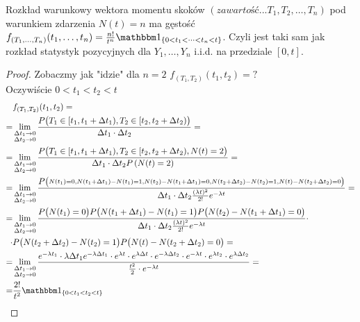 \begin{twr}
Rozkład warunkowy wektora momentu skoków $ \left(zawartość...T_1,T_2,\dots,T_n\right) $ pod warunkiem zdarzenia $ N(t)=n $ ma gęstość $ f_{(T_1,\dots,T_n)}(t_1,\dots,t_n)=\frac{n!}{t^n}\mathbbm1_{\{0<t_1<\dots<t_n<t\}} $. Czyli jest taki sam jak rozkład statystyk pozycyjnych dla $ Y_1,\dots,Y_n$ i.i.d. na przedziale $ [0,t] $.
\begin{proof}
Zobaczmy jak "idzie" dla $ n=2 $ $ f_{(T_1,T_2)}(t_1,t_2)=? $\\
Oczywiście $ 0<t_1<t_2<t $
\begin{align*}
&f_{(T_1,T_2)}(t_1,t_2)
=\\=&
\lim\limits_{\substack{\Delta t_1\to0\\\Delta t_2\to0}}
\frac{P\bigl(T_1\in[t_1,t_1+\Delta t_1),T_2\in[t_2,t_2+\Delta t_2)\bigr)}{\Delta t_1\cdot \Delta t_2}
=\\=&
\lim\limits_{\substack{\Delta t_1\to0\\\Delta t_2\to0}}
\frac{P\bigl(T_1\in[t_1,t_1+\Delta t_1),T_2\in[t_2,t_2+\Delta t_2),N(t)=2\bigr)}{\Delta t_1\cdot \Delta t_2P\left(N(t)=2\right)}
=\\=&
\lim\limits_{\substack{\Delta t_1\to0\\\Delta t_2\to0}}
\frac{P\bigl(
\substack{N(t_1)=0,N(t_1+\Delta t_1)-N(t_1)=1,N(t_2)-N(t_1+\Delta t_1)=0,N(t_2+\Delta t_2)-N(t_2)=1,N(t)-N(t_2+\Delta t_2)=0}
\bigr)}{\Delta t_1\cdot \Delta t_2\frac{(\lambda t)^2}{2!}e^{-\lambda t}}
=\\=&
\lim\limits_{\substack{\Delta t_1\to0\\\Delta t_2\to0}}
\frac{P\bigl(
N(t_1)=0\bigr)P\bigl(N(t_1+\Delta t_1)-N(t_1)=1\bigr)P\bigl(N(t_2)-N(t_1+\Delta t_1)=0\bigr)}{\Delta t_1\cdot \Delta t_2\frac{(\lambda t)^2}{2!}e^{-\lambda t}}
\cdot\\\cdot
&P\bigl(N(t_2+\Delta t_2)-N(t_2)=1\bigr)P\bigl(N(t)-N(t_2+\Delta t_2)=0
\bigr)
=\\=&
\lim\limits_{\substack{\Delta t_1\to0\\\Delta t_2\to0}}
\frac{e^{-\lambda t_1}\cdot \lambda\Delta t_1e^{-\lambda\Delta t_1}\cdot e^{\lambda t}\cdot e^{\lambda\Delta t}\cdot e^{-\lambda\Delta t_2}\cdot e^{-\lambda t}\cdot e^{\lambda t_2}\cdot e^{\lambda\Delta t_2}}{\frac{t^2}{2}\cdot e^{-\lambda t}}
=\\=&
\frac{2!}{t^2}\mathbbm1_{\left\{0<t_1<t_2<t\right\}}
\end{align*}
\end{proof}
\end{twr}
